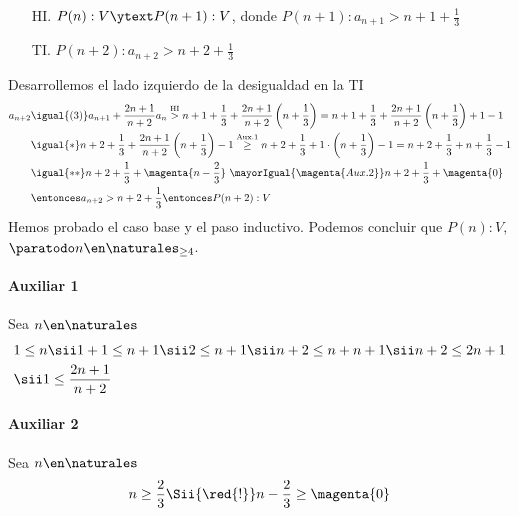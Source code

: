\begin{enumerate}[label=\roman*)]
        \begin{enumerate}
          \item[HI.] $P(n):V \ytext P(n+1):V$, donde $P(n+1): a_{n+1} > n + 1 + \displaystyle \frac{1}{3}$
          \item[TI.] $P(n+2): a_{n+2} > n + 2 + \displaystyle \frac{1}{3}$
        \end{enumerate}
        Desarrollemos el lado izquierdo de la desigualdad en la TI
        \begin{align*}
          a_{n+2} & \igual{(3)} a_{n+1} + \frac{2n+1}{n+2}a_n \overset{\text{HI}}{>}
          n + 1 + \frac{1}{3} + \frac{2n+1}{n+2}\left(n + \frac{1}{3}\right)
          = n + 1 + \frac{1}{3} + \frac{2n+1}{n+2}\left(n + \frac{1}{3}\right) + 1 - 1                                                          \\
                  & \igual{*} n + 2 + \frac{1}{3} + \frac{2n+1}{n+2}\left(n + \frac{1}{3}\right) - 1
          \overset{\text{Aux.1}}{\geq} n + 2 + \frac{1}{3} + 1 \cdot \left(n + \frac{1}{3}\right) - 1
          = n + 2 + \frac{1}{3} + n + \frac{1}{3} - 1                                                                                           \\
                  & \igual{**} n + 2 + \frac{1}{3} + \magenta{n - \frac{2}{3}} \ \mayorIgual{\magenta{Aux.2}} n + 2 + \frac{1}{3} + \magenta{0} \\
                  & \entonces a_{n+2} > n + 2 + \frac{1}{3} \entonces P(n+2):V
        \end{align*}
        Hemos probado el caso base y el paso inductivo. Podemos concluir que $P(n):V,$ $\paratodo n \en \naturales _{\geq 4}$.

        \paragraph{Auxiliar 1}{Sea $n \en \naturales $
          \begin{align*}
             & 1 \leq n \sii 1 + 1 \leq n + 1 \sii 2 \leq n + 1 \sii n + 2 \leq n + n + 1 \sii n + 2 \leq 2n + 1 \\
             & \sii 1 \leq \frac{2n+1}{n+2}
          \end{align*}
        }

        \paragraph{Auxiliar 2}{Sea $n \en \naturales $
          \begin{align*}
            n \geq  \frac{2}{3}
            \Sii{\red{!}}
            n - \frac{2}{3} \geq \magenta{0}
          \end{align*}
        }

\end{enumerate}

\begin{aportes}
  \item {}
  \item {}
\end{aportes}
